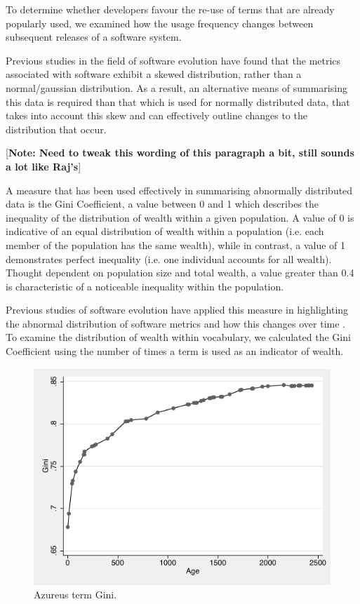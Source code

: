 
To determine whether developers favour the re-use of terms that are already popularly used, we examined how the usage frequency changes between subsequent releases of a software system.

Previous studies in the field of software evolution have found that the metrics associated with software exhibit a skewed distribution, rather than a normal/gaussian distribution. As a result, an alternative means of summarising this data is required than that which is used for normally distributed data, that takes into account this skew and can effectively outline changes to the distribution that occur.

[\textbf{Note: Need to tweak this wording of this paragraph a bit, still sounds a lot like Raj's}]

A measure that has been used effectively in summarising abnormally distributed data is the Gini Coefficient, a value between 0 and 1 which describes the inequality of the distribution of wealth within a given population. A value of 0 is indicative of an equal distribution of wealth within a population (i.e. each member of the population has the same wealth), while in contrast, a value of 1 demonstrates perfect inequality (i.e. one individual accounts for all wealth). Thought dependent on population size and total wealth, a value greater than 0.4 is characteristic of a noticeable inequality within the population.

Previous studies of software evolution have applied this measure in highlighting the abnormal distribution of software metrics and how this changes over time \cite{Vasa09a}. To examine the distribution of wealth within vocabulary, we calculated the Gini Coefficient using the number of times a term is used as an indicator of wealth.

\begin{figure}[t]
\centering
\includegraphics[width=\textwidth]{Figures/Vocab-AzureusGini.pdf}
\caption{Azureus term Gini.}
\label{fig:vocab-gini-azureus}
\end{figure}

